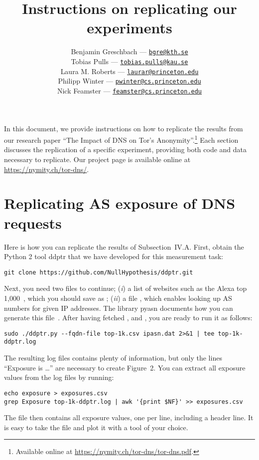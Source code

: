 \documentclass{article}
\title{Instructions on replicating our experiments}
\author{%
	Benjamin Greschbach --- \href{mailto:bgre@kth.se}{\nolinkurl{bgre@kth.se}} \\
	Tobias Pulls --- \href{mailto:tobias.pulls@kau.se}{\nolinkurl{tobias.pulls@kau.se}} \\
	Laura M. Roberts --- \href{mailto:laurar@princeton.edu}{\nolinkurl{laurar@princeton.edu}} \\
	Philipp Winter --- \href{mailto:pwinter@cs.princeton.edu}{\nolinkurl{pwinter@cs.princeton.edu}} \\
	Nick Feamster --- \href{mailto:feamster@cs.princeton.edu}{\nolinkurl{feamster@cs.princeton.edu}}
}
\newcommand{\first}{(\emph{i})\xspace}
\newcommand{\second}{(\emph{ii})\xspace}
\begin{document}
\maketitle

In this document, we provide instructions on how to replicate the results from
our research paper ``The Impact of DNS on Tor's Anonymity''.\footnote{Available
online at \url{https://nymity.ch/tor-dns/tor-dns.pdf}.} Each section discusses
the replication of a specific experiment, providing both code and data necessary
to replicate.  Our project page is available online at
\url{https://nymity.ch/tor-dns/}.

\tableofcontents

\newpage

\section{Replicating AS exposure of DNS requests}
Here is how you can replicate the results of Subsection~IV.A.  First, obtain the
Python 2 tool ddptr that we have developed for this measurement task:

\begin{lstlisting}
git clone https://github.com/NullHypothesis/ddptr.git
\end{lstlisting}

Next, you need two files to continue; \first a list of websites such as the
Alexa top 1,000~\cite{alexatop1k}, which you should save as ;
\second a file , which enables looking up AS numbers for given IP
addresses.  The library pyasn documents how you can generate this
file~\cite{pyasn}.  After having fetched ,  and
, you are ready to run it as follows:

\begin{lstlisting}
sudo ./ddptr.py --fqdn-file top-1k.csv ipasn.dat 2>&1 | tee top-1k-ddptr.log
\end{lstlisting}

The resulting log files contains plenty of information, but only the lines
``Exposure is \ldots'' are necessary to create Figure~2.  You can extract all
exposure values from the log files by running:

\begin{lstlisting}
echo exposure > exposures.csv
grep Exposure top-1k-ddptr.log | awk '{print $NF}' >> exposures.csv
\end{lstlisting}

The file  then contains all exposure values, one per line,
including a header line.  It is easy to take the file and plot it with a tool of
your choice.
\end{document}
